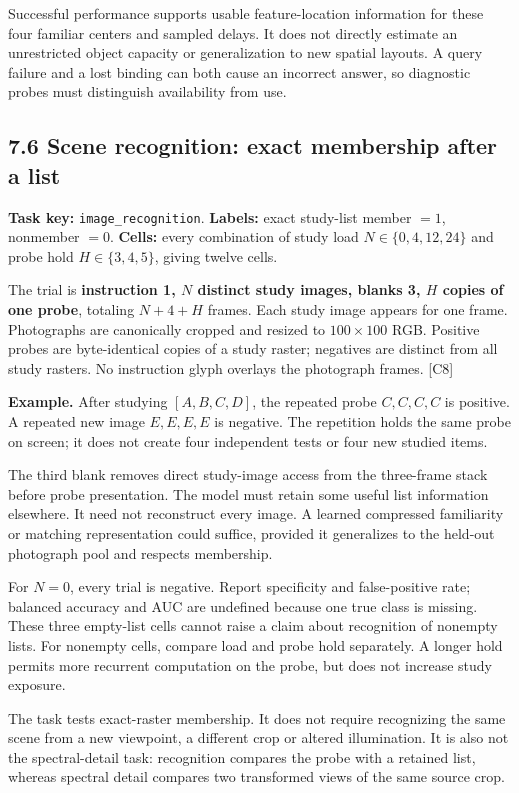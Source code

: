 \documentclass[
  11pt,
]{article}
\newcounter{none} %
\let\oldsubsection\subsection
\renewcommand{\subsection}{\Needspace{6\baselineskip}\oldsubsection}
\begin{document}
Successful performance supports usable feature-location information for
these four familiar centers and sampled delays. It does not directly
estimate an unrestricted object capacity or generalization to new
spatial layouts. A query failure and a lost binding can both cause an
incorrect answer, so diagnostic probes must distinguish availability
from use.

\subsection{7.6 Scene recognition: exact membership after a
list}\label{scene-recognition-exact-membership-after-a-list}

\textbf{Task key:} \texttt{image\_recognition}. \textbf{Labels:} exact
study-list member \(=1\), nonmember \(=0\). \textbf{Cells:} every
combination of study load \(N\in\{0,4,12,24\}\) and probe hold
\(H\in\{3,4,5\}\), giving twelve cells.

The trial is \textbf{instruction 1, \(N\) distinct study images, blanks
3, \(H\) copies of one probe}, totaling \(N+4+H\) frames. Each study
image appears for one frame. Photographs are canonically cropped and
resized to \(100\times100\) RGB. Positive probes are byte-identical
copies of a study raster; negatives are distinct from all study rasters.
No instruction glyph overlays the photograph frames. {[}C8{]}

\textbf{Example.} After studying \([A,B,C,D]\), the repeated probe
\(C,C,C,C\) is positive. A repeated new image \(E,E,E,E\) is negative.
The repetition holds the same probe on screen; it does not create four
independent tests or four new studied items.

The third blank removes direct study-image access from the three-frame
stack before probe presentation. The model must retain some useful list
information elsewhere. It need not reconstruct every image. A learned
compressed familiarity or matching representation could suffice,
provided it generalizes to the held-out photograph pool and respects
membership.

For \(N=0\), every trial is negative. Report specificity and
false-positive rate; balanced accuracy and AUC are undefined because one
true class is missing. These three empty-list cells cannot raise a claim
about recognition of nonempty lists. For nonempty cells, compare load
and probe hold separately. A longer hold permits more recurrent
computation on the probe, but does not increase study exposure.

The task tests exact-raster membership. It does not require recognizing
the same scene from a new viewpoint, a different crop or altered
illumination. It is also not the spectral-detail task: recognition
compares the probe with a retained list, whereas spectral detail
compares two transformed views of the same source crop.
\end{document}
